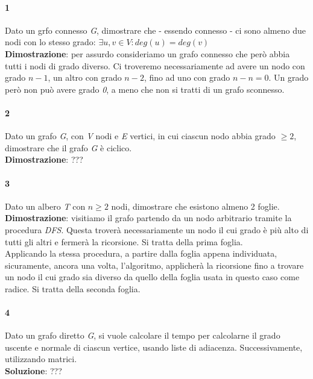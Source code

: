 \paragraph{1}
Dato un grfo connesso \textit{G}, dimostrare che - essendo connesso - ci sono almeno due nodi con lo stesso grado: $ \exists u,v \in V : deg(u) = deg(v) $ \\
\textbf{Dimostrazione}: per assurdo consideriamo un grafo connesso che però abbia tutti i nodi di grado diverso. Ci troveremo necessariamente ad avere un nodo con grado $n-1$, un altro con grado $n-2$, fino ad uno con grado $n-n = 0$. Un grado però non può avere grado \textit{0}, a meno che non si tratti di un grafo sconnesso.

\paragraph{2}
Dato un grafo \textit{G}, con \textit{V} nodi e \textit{E} vertici, in cui ciascun nodo abbia grado $\geq 2$, dimostrare che il grafo \textit{G} è ciclico. \\
\textbf{Dimostrazione}: ???

\paragraph{3}
Dato un albero \textit{T} con $n \geq 2$ nodi, dimostrare che esistono almeno 2 foglie. \\
\textbf{Dimostrazione}: visitiamo il grafo partendo da un nodo arbitrario tramite la procedura \textit{DFS}. Questa troverà necessariamente un nodo il cui grado è più alto di tutti gli altri e fermerà la ricorsione. Si tratta della prima foglia. \\
Applicando la stessa procedura, a partire dalla foglia appena individuata, sicuramente, ancora una volta, l'algoritmo, applicherà la ricorsione fino a trovare un nodo il cui grado sia diverso da quello della foglia usata in questo caso come radice. Si tratta della seconda foglia.

\paragraph{4}
Dato un grafo diretto \textit{G}, si vuole calcolare il tempo per calcolarne il grado uscente e normale di ciascun vertice, usando liste di adiacenza. Successivamente, utilizzando matrici. \\
\textbf{Soluzione}: ???
\newpage

